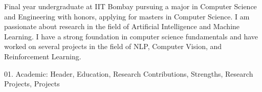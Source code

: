 \documentclass[12pt,a4paper]{moderncv}
\begin{document}
\begin{CJK*}{UTF8}{gbsn}

\makecvtitle

\small{Final year undergraduate at IIT Bombay pursuing a major in Computer Science and Engineering with honors, applying for masters in Computer Science. I am passionate about research in the field of Artificial Intelligence and Machine Learning. I have a strong foundation in computer science fundamentals and have worked on several projects in the field of NLP, Computer Vision, and Reinforcement Learning.}




\pagebreak




01. Academic: Header, Education, Research Contributions, Strengths, Research Projects, Projects



\end{CJK*}
\end{document}
